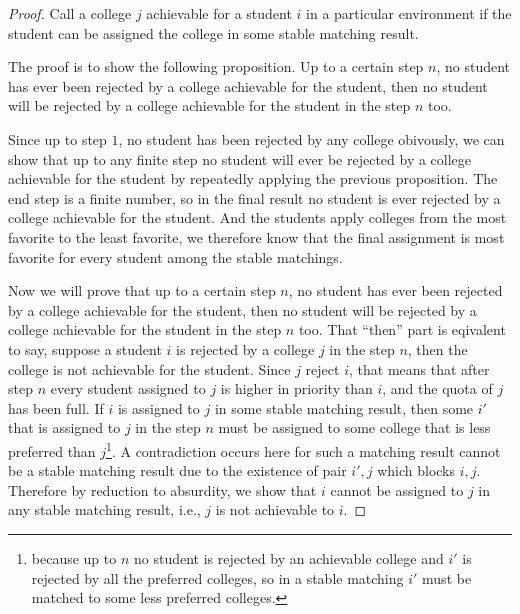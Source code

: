 \begin{proof}
Call a college $j$ achievable for a student $i$ in a particular
environment if the student can be assigned the college in some stable
matching result. 

The proof is to show the following proposition. Up to a certain step $ n $, no student has ever
been rejected by a college achievable for the student, then no student
will be rejected by a college achievable for the student in the step
$n$ too. 

Since up to step $1$, no student has been rejected by any
college obivously, we can show that up to  any finite step no student
will ever be rejected by  a college achievable for the student by
repeatedly applying the previous proposition.  The
end step is a finite number, so in the final result no student is ever
rejected by a college achievable for the student. And the students apply colleges from the most favorite to the least favorite, we therefore know that the final assignment is most favorite for every
student among the stable matchings.

Now we will prove that up to a certain step $ n $, no student has ever
been rejected by a college achievable for the student, then no student
will be rejected by a college achievable for the student in the step
$n$ too.  
That ``then'' part is
eqivalent to
say, suppose a
student $i$ is rejected by a college  $j$ in the
step $n$, then the college is not achievable for the student. Since
$j$ reject $i$, that means that  after
step $n$ every student assigned to $j$ is higher in priority than $i$,
and the quota of $j$ has been full. If $i$ is assigned to $j$ in some
stable 
matching result, then some $i'$ that is assigned to $j$ in the step
$n$ must be assigned to some college that is less preferred than $j$\footnote{
because up to $n$ no student is rejected by an achievable college and $i'$ is rejected by all the preferred colleges, so in a stable matching $i'$ must be matched to some less preferred colleges. }. A
contradiction occurs here for such a matching result cannot be
a stable matching result due to the existence of pair $i', j $ which
blocks $i, j$. Therefore by reduction to absurdity,  we show that $i$
cannot be assigned to $j$  in any stable matching result, i.e., $j$ is
not achievable to $i$.
\end{proof}



